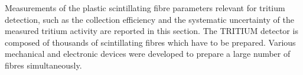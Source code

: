 Measurements of the plastic scintillating fibre parameters relevant for tritium detection, such as the collection efficiency and the systematic uncertainty of the measured tritium activity are reported in this section. The TRITIUM detector is composed of thousands of scintillating fibres which have to be prepared. Various mechanical and electronic devices were developed to prepare a large number of fibres simultaneously.